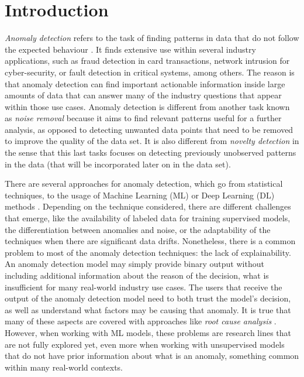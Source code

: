 \chapter{Introduction}\label{ch:introduction}
\textit{Anomaly detection} refers to the task of finding patterns in data that do not follow the expected behaviour \parencite{chandola2009anomaly}. It finds extensive use within several industry applications, such as fraud detection in card transactions, network intrusion for cyber-security, or fault detection in critical systems, among others. The reason is that anomaly detection can find important actionable information inside large amounts of data that can answer many of the industry questions that appear within those use cases.
Anomaly detection is different from another task known as \textit{noise removal} because it aims to find relevant patterns useful for a further analysis, as opposed to detecting unwanted data points that need to be removed to improve the quality of the data set. It is also different from \textit{novelty detection} in the sense that this last tasks focuses on detecting previously unobserved patterns in the data (that will be incorporated later on in the data set).

There are several approaches for anomaly detection, which go from statistical techniques, to the usage of Machine Learning (ML) \parencite{chandola2009anomaly} or Deep Learning (DL) methods \parencite{chalapathy2019deep}. Depending on the technique considered, there are different challenges that emerge, like the availability of labeled data for training supervised models, the differentiation between anomalies and noise, or the adaptability of the techniques when there are significant data drifts. Nonetheless, there is a common problem to most of the anomaly detection techniques: the lack of explainability. An anomaly detection model may simply provide binary output without including additional information about the reason of the decision, what is insufficient for many real-world industry use cases. The users that receive the output of the anomaly detection model need to both trust the model's decision, as well as understand what factors may be causing that anomaly. It is true that many of these aspects are covered with approaches like \textit{root cause analysis} \parencite{andersen2006root}. However, when working with ML models, these problems are research lines that are not fully explored yet, even more when working with unsupervised models that do not have prior information about what is an anomaly, something common within many real-world contexts.

